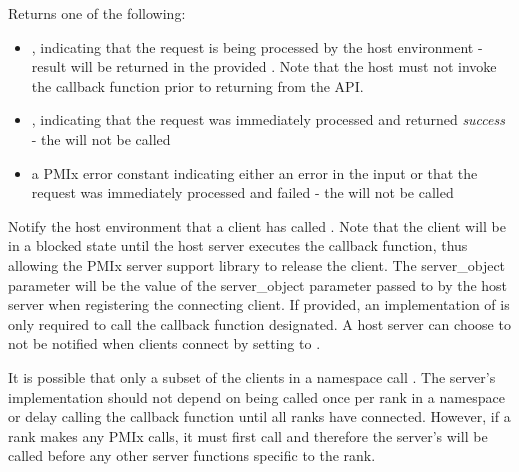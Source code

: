 \begin{arglist}
\end{arglist}

Returns one of the following:

\begin{itemize}
    \item {}, indicating that the request is being processed by the host environment - result will be returned in the provided . Note that the host must not invoke the callback function prior to returning from the \ac{API}.
    \item {}, indicating that the request was immediately processed and returned \textit{success} - the  will not be called
    \item a PMIx error constant indicating either an error in the input or that the request was immediately processed and failed - the  will not be called
\end{itemize}

\descr

Notify the host environment that a client has called .
Note that the client will be in a blocked state until the host server executes the callback function, thus allowing the \ac{PMIx} server support library to release
the client.
The server_object parameter will be the value of the server_object parameter passed to
 by the host server when registering the connecting client.  If provided, an implementation of 
is only required to
call the callback function designated.  A host server can choose to not be notified when clients connect by setting  to .

It is possible that only a subset of the clients in a namespace call .   The server's  implementation
should not depend on being called once per rank in a namespace or delay calling the callback function until all ranks have connected.
However, if a rank makes any \ac{PMIx} calls, it must first call  and
therefore the server's  will be called before any other server functions specific to the rank.


